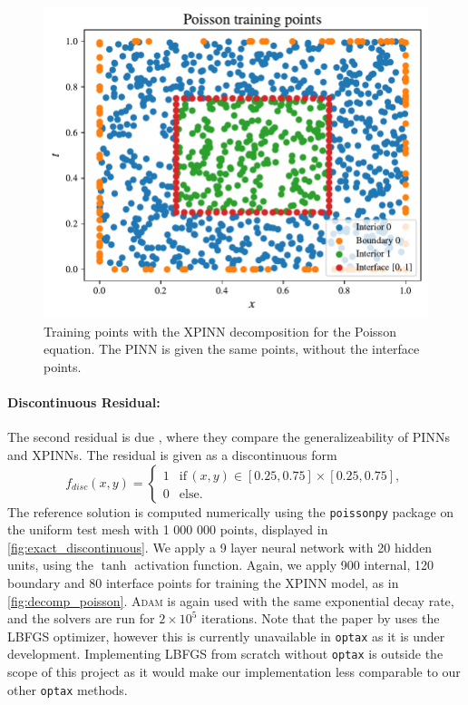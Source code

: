 \begin{figure}[h]
    \centering
    \includegraphics[width=0.8\linewidth]{Project1XPINNs/figures/Poisson/poisson_train_points.pdf.pdf}
    \caption{Training points with the XPINN decomposition for the Poisson equation. The PINN is given the same points, without the interface points.}
    \label{fig:decomp_poisson}
\end{figure}

\paragraph{Discontinuous Residual:}
The second residual is due \textcite{XPINN_generalize}, where they compare the generalizeability of PINNs and XPINNs.
The residual is given as a discontinuous form
\begin{equation*}\label{eq:discontinuous_poisson}
    f_{disc}(x,y)=
    \begin{cases}
        1 &\text{if} \, (x,y)\in [0.25,0.75]\times[0.25,0.75], \\
        0 &\text{else}.
    \end{cases}
\end{equation*}
The reference solution is computed numerically using the \verb|poissonpy| package \cite{poissonpy} on the uniform test mesh with 1 000 000 points, displayed in \autoref{fig:exact_discontinuous}.
We apply a 9 layer neural network with 20 hidden units, using the $\tanh$ activation function.
Again, we apply 900 internal, 120 boundary and 80 interface points for training the XPINN model, as in \autoref{fig:decomp_poisson}.
\textsc{Adam} is again used with the same exponential decay rate, and the solvers are run for $2\times 10^5$ iterations.
Note that the paper by \textcite{XPINN_generalize} uses the LBFGS optimizer, however this is currently unavailable in \verb|optax| as it is under development. Implementing LBFGS from scratch without \verb|optax| is outside the scope of this project as it would make our implementation less comparable to our other \verb|optax| methods.

